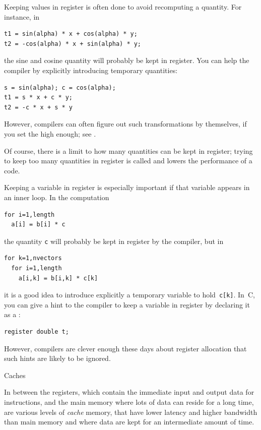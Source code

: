 Keeping values in register is often done to avoid recomputing a
quantity. For instance, in 
\begin{lstlisting}
t1 = sin(alpha) * x + cos(alpha) * y;
t2 = -cos(alpha) * x + sin(alpha) * y;
\end{lstlisting}
the sine and cosine quantity will probably be kept in register. You
can help the compiler by explicitly introducing temporary quantities:
\begin{lstlisting}
s = sin(alpha); c = cos(alpha);
t1 = s * x + c * y;
t2 = -c * x + s * y
\end{lstlisting}
However, 
compilers can often figure out such transformations by themselves,
if you set the  high enough;
  see .

Of course, there is a limit to how many quantities can be kept in
register; trying to keep too many quantities in register is called
 and lowers the performance of a code.

Keeping a variable in register is especially important if that
variable appears in an inner loop. In the computation
\begin{lstlisting}
for i=1,length
  a[i] = b[i] * c
\end{lstlisting}
the quantity \lstinline{c} will probably be kept in register by the compiler,
but in 
\begin{lstlisting}
for k=1,nvectors
  for i=1,length
    a[i,k] = b[i,k] * c[k]
\end{lstlisting}
it is a good idea to introduce explicitly a temporary variable to
hold~\lstinline{c[k]}. In~C, you can give a hint to the compiler
to keep a variable in register by declaring it as a :
\begin{lstlisting}
register double t;
\end{lstlisting}
However, compilers are clever enough these days about register allocation
that such hints are likely to be ignored.


 {Caches}
\label{sec:cache}

In between the registers, which contain the immediate input and output
data for instructions, and the main memory where lots of data can reside for a
long time, are various levels of \emph{cache} memory, that have
lower latency and higher bandwidth than main memory and where data are
kept for an intermediate amount of time.  

